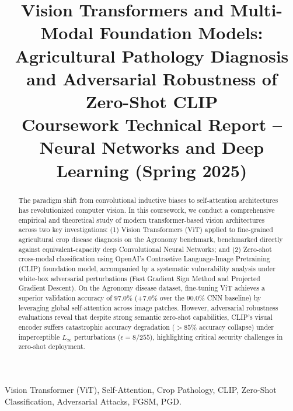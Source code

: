 \documentclass[conference]{IEEEtran}
\begin{document}
\title{Vision Transformers and Multi-Modal Foundation Models: Agricultural Pathology Diagnosis and Adversarial Robustness of Zero-Shot CLIP\\
\large Coursework Technical Report -- Neural Networks and Deep Learning (Spring 2025)}

\author{
}

\maketitle

\begin{abstract}
The paradigm shift from convolutional inductive biases to self-attention architectures has revolutionized computer vision. In this coursework, we conduct a comprehensive empirical and theoretical study of modern transformer-based vision architectures across two key investigations: (1) Vision Transformers (ViT) applied to fine-grained agricultural crop disease diagnosis on the Agronomy benchmark, benchmarked directly against equivalent-capacity deep Convolutional Neural Networks; and (2) Zero-shot cross-modal classification using OpenAI's Contrastive Language-Image Pretraining (CLIP) foundation model, accompanied by a systematic vulnerability analysis under white-box adversarial perturbations (Fast Gradient Sign Method and Projected Gradient Descent). On the Agronomy disease dataset, fine-tuning ViT achieves a superior validation accuracy of $97.0\%$ ($+7.0\%$ over the $90.0\%$ CNN baseline) by leveraging global self-attention across image patches. However, adversarial robustness evaluations reveal that despite strong semantic zero-shot capabilities, CLIP's visual encoder suffers catastrophic accuracy degradation ($>85\%$ accuracy collapse) under imperceptible $L_\infty$ perturbations ($\epsilon = 8/255$), highlighting critical security challenges in zero-shot deployment.
\end{abstract}

\begin{IEEEkeywords}
Vision Transformer (ViT), Self-Attention, Crop Pathology, CLIP, Zero-Shot Classification, Adversarial Attacks, FGSM, PGD.
\end{IEEEkeywords}
\end{document}
